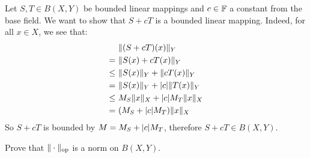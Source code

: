 \documentclass{article}
\begin{document}
\begin{soln}
    Let $ S, T \in B(X, Y) $ be bounded linear mappings and $ c \in \mathbb{F} $ a constant
    from the base field.
    We want to show that $ S + cT $ is a bounded linear mapping. \vsp
    Indeed, for all $ x \in X $, we see that:
    \begin{align*}
         & \|(S + cT)(x)\|_{Y} \\
        = \ & \|S(x) + cT(x)\|_{Y} \\
        \leq \ & \|S(x)\|_{Y} + \|cT(x)\|_{Y} \\
        = \ & \|S(x)\|_{Y} + \abs{c} \|T(x)\|_{Y} \\
        \leq \ & M_{S}\|x\|_{X} + \abs{c}M_{T}\|x\|_{X} \\
        = \ & (M_{S} + \abs{c}M_{T})\|x\|_{X}
    \end{align*}
    So $ S + cT $ is bounded by $ M = M_{S} + \abs{c}M_{T} $, therefore $ S + cT \in B(X, Y) $.
\end{soln}

\begin{qu}
    Prove that $ \|\cdot\|_{\textrm{op}} $ is a norm on $ B(X, Y) $.
\end{qu}
\end{document}
